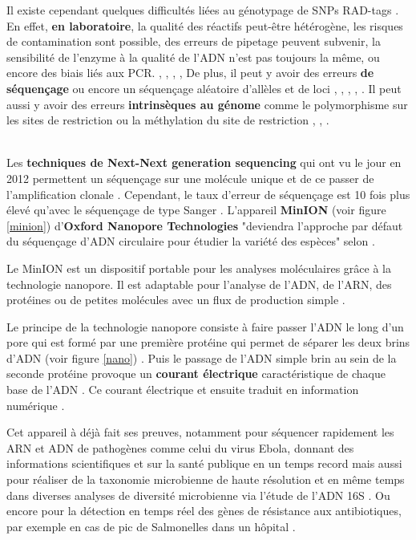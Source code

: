 \documentclass[a4paper]{article}
\begin{document}
Il existe cependant quelques difficultés liées au génotypage de SNPs RAD-tags \cite{Pante.E.:2014} \cite{mastretta2015restriction}.
En effet, \textbf{en laboratoire}, la qualité des réactifs peut-être hétérogène, les risques de contamination sont possible, des erreurs de pipetage peuvent subvenir, la sensibilité de l’enzyme à la qualité de l’ADN n'est pas toujours la même, ou encore des biais liés aux PCR. \cite{Bonin:2004aa}, \cite{Baird:2008aa}, \cite{peterson2012double}, \cite{hohenlohe2012extensive}, \cite{Pante.E.:2014}
De plus, il peut y avoir des erreurs \textbf{de séquençage} ou encore un séquençage aléatoire d’allèles et de loci \cite{meacham2011identification}, \cite{nielsen2011genotype}, \cite{hohenlohe2012extensive}, \cite{loman2012performance}, \cite{Pante.E.:2014}.
Il peut aussi y avoir des erreurs \textbf{intrinsèques au génome} comme le polymorphisme sur les sites de restriction ou la méthylation du site de restriction \cite{davey2013special}, \cite{gautier2013effect}, \cite{Pante.E.:2014}.

~~\\

Les \textbf{techniques de Next-Next generation sequencing} qui ont vu le jour en 2012 permettent un séquençage sur une molécule unique et de ce passer de l'amplification clonale \cite{Boyle:2014:aa}. Cependant, le taux d'erreur de séquençage est 10 fois plus élevé qu'avec le séquençage de type Sanger \cite{Boyle:2014:aa}. L'appareil \textbf{MinION} (voir figure \ref{minion}) d'\textbf{Oxford Nanopore Technologies} "deviendra l'approche par défaut du séquençage d'ADN circulaire pour étudier la variété des espèces" selon \cite{hargreaves2015assessing}. 

Le MinION est un dispositif portable pour les analyses moléculaires grâce à la technologie nanopore. Il est adaptable pour l'analyse de l'ADN, de l'ARN, des protéines ou de petites molécules avec un flux de production simple \cite{nanoport}.

Le principe de la technologie nanopore consiste à faire passer l'ADN le long d'un pore qui est formé par une première protéine qui permet de séparer les deux brins d'ADN (voir figure \ref{nano}) \cite{Boyle:2014:aa}. Puis le passage de l'ADN simple brin au sein de la seconde protéine provoque un \textbf{courant électrique} caractéristique de chaque base de l'ADN \cite{Boyle:2014:aa}. Ce courant électrique et ensuite traduit en information numérique \cite{hargreaves2015assessing}. 

Cet appareil à déjà fait ses preuves, notamment pour séquencer rapidement les ARN et ADN de pathogènes comme celui du virus Ebola, donnant des informations scientifiques et sur la santé publique en un temps record \cite{Hoenen:2015:aa} mais aussi pour réaliser de la taxonomie microbienne de haute résolution et en même temps dans diverses analyses de diversité microbienne via l'étude de l'ADN 16S \cite{benitez2015species}. Ou encore pour la détection en temps réel des gènes de résistance aux antibiotiques, par exemple en cas de pic de Salmonelles dans un hôpital \cite{Quick:2015aa}.
\end{document}
